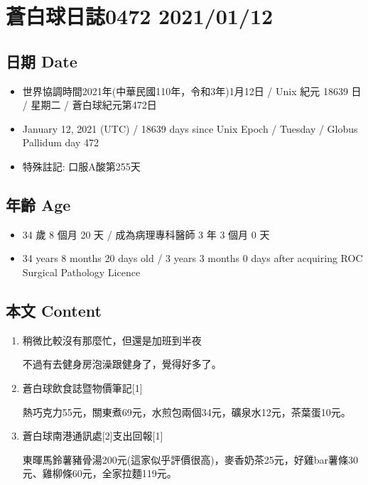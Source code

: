 \documentclass[a5paper, 11pt
]{book}
\providecommand{\tightlist}{%
  \setlength{\itemsep}{0pt}\setlength{\parskip}{0pt}}
\begin{document}
\hypertarget{ux84bcux767dux7403ux65e5ux8a8c0472-20210112}{%
\section{蒼白球日誌0472
2021/01/12}\label{ux84bcux767dux7403ux65e5ux8a8c0472-20210112}}

\hypertarget{ux65e5ux671f-date-42}{%
\subsection{日期 Date}\label{ux65e5ux671f-date-42}}

\begin{itemize}
\tightlist
\item
  世界協調時間2021年(中華民國110年，令和3年)1月12日 / Unix 紀元 18639 日
  / 星期二 / 蒼白球紀元第472日
\item
  January 12, 2021 (UTC) / 18639 days since Unix Epoch / Tuesday /
  Globus Pallidum day 472
\item
  特殊註記: 口服A酸第255天
\end{itemize}

\hypertarget{ux5e74ux9f61-age-42}{%
\subsection{年齡 Age}\label{ux5e74ux9f61-age-42}}

\begin{itemize}
\tightlist
\item
  34 歲 8 個月 20 天 / 成為病理專科醫師 3 年 3 個月 0 天
\item
  34 years 8 months 20 days old / 3 years 3 months 0 days after
  acquiring ROC Surgical Pathology Licence
\end{itemize}

\hypertarget{ux672cux6587-content-42}{%
\subsection{本文 Content}\label{ux672cux6587-content-42}}

\begin{enumerate}
\def\labelenumi{\arabic{enumi}.}
\item
  稍微比較沒有那麼忙，但還是加班到半夜

  不過有去健身房泡澡跟健身了，覺得好多了。
\item
  蒼白球飲食誌暨物價筆記{[}1{]}

  熱巧克力55元，關東煮69元，水煎包兩個34元，礦泉水12元，茶葉蛋10元。
\item
  蒼白球南港通訊處{[}2{]}支出回報{[}1{]}

  東暉馬鈴薯豬骨湯200元(這家似乎評價很高)，麥香奶茶25元，好雞bar薯條30元、雞柳條60元，全家拉麵119元。
\end{enumerate}
\end{document}

